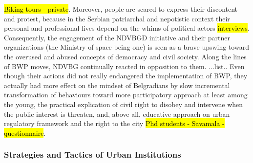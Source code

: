 \documentclass[11pt]{report}
\begin{document}
\hl{Biking tours - private}.
Moreover, people are scared to express their discontent and protest, because in the Serbian patriarchal and nepotistic context their personal and professional lives depend on the whims of political actors \hl{interviews}.
\\
Consequently, the engagement of the NDVBGD initiative and their partner organizations (the Ministry of space being one) is seen as a brave upswing toward the overused and abused concepts of democracy and civil society.
Along the lines of BWP moves, NDVBG continually reacted in opposition to them.
...list.. 
Even though their actions did not really endangered the implementation of BWP, they actually had more effect on the mindset of Belgradians by slow incremental transformation of behaviours toward more participatory approach at least among the young, the practical explication of civil right to disobey and intervene when the public interest is threaten, and, above all, educative approach on urban regulatory framework and the right to the city
\hl{Phd students - Savamala - questionnaire}.

\subsubsection{Strategies and Tactics of Urban Institutions}
\end{document}
